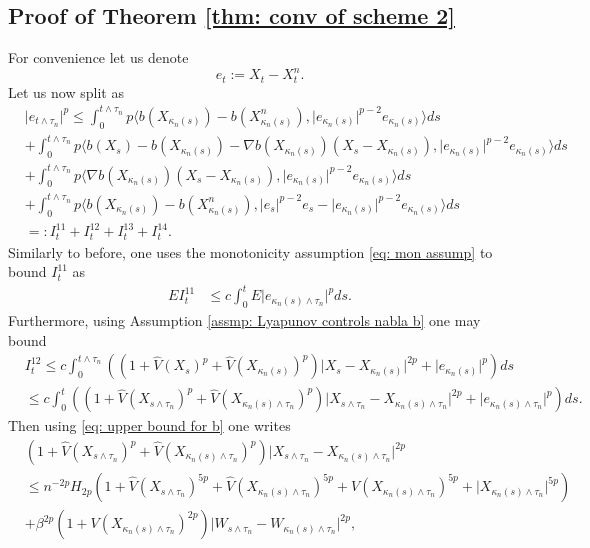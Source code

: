 \documentclass{article}
\begin{document}
\subsection{Proof of Theorem \ref{thm: conv of scheme 2}}
For convenience let us denote
\begin{equation}
    e_t:=X_t-X^n_t.
\end{equation}
Let us now split as
    \begin{align}\label{eq: new splitting}
&\lvert e_{t\wedge \tau_n}\rvert^p\leq \int^{t\wedge  \tau_n}_0 p\langle b(X_{\kappa_n(s)})-b(X^n_{\kappa_n(s)}),\lvert e_{\kappa_n(s)}\rvert^{p-2}e_{\kappa_n(s)}\rangle ds\nonumber \\
&+\int^{t\wedge  \tau_n}_0 p\langle b(X_s)-b(X_{\kappa_n(s)})-\nabla b(X_{\kappa_n(s)})(X_s-X_{\kappa_n(s)}),\lvert e_{\kappa_n(s)}\rvert^{p-2}e_{\kappa_n(s)}\rangle ds \nonumber \\
&+\int^{t\wedge \tau_n}_0 p\langle \nabla b(X_{\kappa_n(s)})(X_s-X_{\kappa_n(s)}),\lvert e_{\kappa_n(s)}\rvert^{p-2}e_{\kappa_n(s)}\rangle ds \nonumber \\
&+\int^{t\wedge \tau_n}_0 p\langle b(X_{\kappa_n(s)})-b(X^n_{\kappa_n(s)}),\lvert e_s\rvert^{p-2}e_s-\lvert e_{\kappa_n(s)}\rvert^{p-2}e_{\kappa_n(s)}\rangle ds\nonumber \\
&=:I^{11}_t+I^{12}_t+I^{13}_t+I^{14}_t.
    \end{align}
Similarly to before, one uses the monotonicity assumption \eqref{eq: mon assump} to bound $I^{11}_t$ as
    \begin{align}\label{eq: I^1_t1}
  EI^{11}_t&\leq   c \int^t_0 E\lvert e_{\kappa_n(s)\wedge\tau_n}\rvert^pds.
    \end{align}
Furthermore, using Assumption \ref{assmp: Lyapunov controls nabla b} one may bound
\begin{align}
    &I^{12}_t\leq c \int^{t\wedge\tau_n}_0 ((1+\hat{V}(X_s)^p+\hat{V}(X_{\kappa_n(s)})^p)\lvert X_s-X_{\kappa_n(s)}\rvert^{2p}+\lvert e_{\kappa_n(s)}\rvert^p)ds \nonumber \\
    &\leq c \int^t_0 ((1+\hat{V}(X_{s\wedge  \tau_n})^p+\hat{V}(X_{\kappa_n(s)\wedge  \tau_n})^p)\lvert X_{s\wedge  \tau_n}-X_{\kappa_n(s)\wedge \tau_n}\rvert^{2p}+\lvert e_{\kappa_n(s)\wedge  \tau_n }\rvert^p)ds .
\end{align}
Then using \eqref{eq: upper bound for b} one writes
\begin{align}
   &(1+\hat{V}(X_{s\wedge  \tau_n})^p+\hat{V}(X_{\kappa_n(s)\wedge  \tau_n})^p)\lvert X_{s\wedge  \tau_n}-X_{\kappa_n(s)\wedge \tau_n}\rvert^{2p} \nonumber \\
   &\leq n^{-2p}H_{2p}(1+\hat{V}(X_{s\wedge  \tau_n})^{5p}+\hat{V}(X_{\kappa_n(s)\wedge  \tau_n})^{5p}+V(X_{\kappa_n(s)\wedge \tau_n})^{5p}+\lvert X_{\kappa_n(s)\wedge \tau_n}\rvert^{5p})\nonumber \\
   &+\beta^{2p}(1+V(X_{\kappa_n(s)\wedge \tau_n})^{2p})\lvert W_{s\wedge  \tau_n}-W_{\kappa_n(s)\wedge \tau_n}\rvert^{2p},
\end{align}
\end{document}
